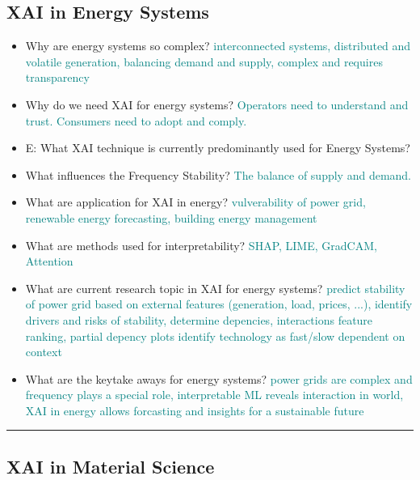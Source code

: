 \documentclass{report}
\newcommand{\asw}[2][teal]{}
\renewcommand{\asw}[2][teal]{\textcolor{#1}{#2}}
\begin{document}
		\subsection{XAI in Energy Systems}
		
		\begin{itemize}
		\item Why are energy systems so complex?
		\asw{\newline interconnected systems, distributed and volatile generation, balancing demand and supply, complex and requires transparency}
		\item Why do we need XAI for energy systems?
		\asw{\newline Operators need to understand and trust. Consumers need to adopt and comply.}
		\item E: What XAI technique is currently predominantly used for Energy Systems?
		\asw{\newline }
		\item What influences the Frequency Stability?
		\asw{\newline The balance of supply and demand.}
		\item What are application for XAI in energy?
		\asw{\newline vulverability of power grid, renewable energy forecasting, building energy management}
		\item What are methods used for interpretability?
		\asw{\newline SHAP, LIME, GradCAM, Attention}
		\item What are current research topic in XAI for energy systems?
		\asw{\newline predict stability of power grid based on external features (generation, load, prices, ...), 
			\newline identify drivers and risks of stability, determine depencies, interactions
			\newline feature ranking, partial depency plots
			\newline identify technology as fast/slow dependent on context}
		\item What are the keytake aways for energy systems?
		\asw{\newline power grids are complex and frequency plays a special role, interpretable ML reveals interaction in world, XAI in energy allows forcasting and insights for a sustainable future}
		\end{itemize}
		\hrule 
	
		\subsection{XAI in Material Science}
		
\end{document}
